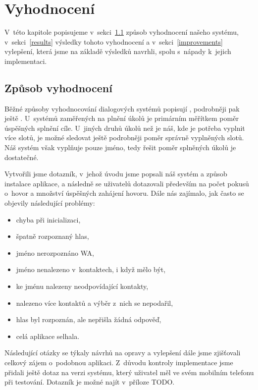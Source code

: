 \chapter{Vyhodnocení}\label{chapter-results}

V~této kapitole popisujeme v~sekci~\ref{methods} způsob vyhodnocení našeho systému,
v~sekci~\ref{results} výsledky tohoto vyhodnocení a v~sekci~\ref{improvements}
vylepšení, která jsme na základě výsledků navrhli, spolu s~nápady k~jejich implementaci.

\section{Způsob vyhodnocení}\label{methods}

Běžné způsoby vyhodnocování dialogových systémů popisují
\citet[sekce 24.5]{jurafsky_slp_2020}, podrobněji pak ještě \citet{Deriu_2020}.
U~systémů zaměřených na plnění úkolů je primárním měřítkem poměr úspěšných
splnění cíle. U~jiných druhů úkolů než je náš, kde je potřeba vyplnit více slotů, je možné
sledovat ještě podrobněji poměr správně vyplněných slotů. Náš systém však
vyplňuje pouze jméno, tedy řešit poměr splněných úkolů je dostatečné.

Vytvořili jsme dotazník, v~jehož úvodu jsme popsali náš systém a způsob instalace
aplikace, a následně se uživatelů dotazovali především na počet pokusů o~hovor a
množství úspěšných zahájení hovoru. Dále nás zajímalo, jak často se objevily
následující problémy:
\begin{itemize}
    \item chyba při inicializaci,
    \item špatně rozpoznaný hlas,
    \item jméno nerozpoznáno WA,
    \item jméno nenalezeno v~kontaktech, i když mělo být,
    \item ke jménu nalezeny neodpovídající kontakty,
    \item nalezeno více kontaktů a výběr z~nich se nepodařil,
    \item hlas byl rozpoznán, ale nepřišla žádná odpověď,
    \item celá aplikace selhala.
\end{itemize}
Následující otázky se týkaly návrhů na opravy a vylepšení dále jsme zjišťovali celkový
zájem o~podobnou aplikaci. Z~důvodu kontroly implementace jsme přidali ještě
dotaz na verzi systému, který uživatel měl ve svém mobilním telefonu při testování. Dotazník je
možné najít v~příloze TODO.

